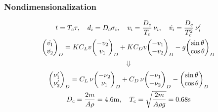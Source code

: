 \documentclass{beamer}
\begin{document}

\begin{frame}

\frametitle{Nondimensionalization}

\begin{gather}
t = T_c \tau,  \quad d_i = D_c \sigma_i, \quad v_i = \dfrac{D_c}{T_c} \, \nu_i, \quad
\dot{v_i} = \dfrac{D_c}{T_c^2} \, \nu_i'
\\
\mqty( \dot{v_1} \\ \dot{v_2}\\)_D = K  C_L v \mqty(-v_2 \\ v_1\\)_D + K C_D v \mqty(-v_1 \\ -v_2\\)_D - g  \mqty(\sin \theta \\ \cos \theta)_D
\end{gather}
$$\Downarrow$$
\begin{gather}
\mqty( \nu_1' \\ \nu_2' \\)_D = C_L  \, \nu \mqty(-\nu_2 \\ \nu_1\\)_D + C_D \, \nu \mqty(-\nu_1 \\ -\nu_2\\)_D -   \mqty(\sin \theta \\ \cos \theta)_D
\\
D_c = \dfrac{2m}{A \rho} = 4.6 \mathrm{m}, \quad T_c = \sqrt{\dfrac{2m}{A \rho g}} = 0.68 \mathrm{s}
\end{gather}

\end{frame}

\end{document}

